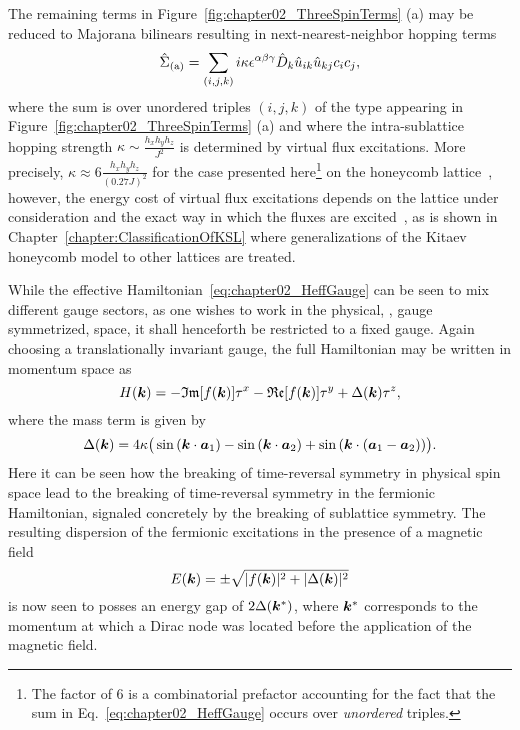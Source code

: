 The remaining terms in Figure~\ref{fig:chapter02_ThreeSpinTerms} (a) may be reduced to Majorana bilinears resulting in next-nearest-neighbor hopping terms
%
\begin{equation}
	\hat{\Sigma}_{\rm (a)} = \sum_{(i,j,k)} i \kappa \epsilon^{\alpha\beta\gamma} \hat{D}_k \hat{u}_{ik} \hat{u}_{kj} c_i c_j,
	\label{eq:chapter02_HeffGauge}
\end{equation}
%
where the sum is over unordered triples $(i,j,k)$ of the type appearing in Figure~\ref{fig:chapter02_ThreeSpinTerms} (a) and where the intra-sublattice hopping strength $\kappa \sim \frac{h_x h_y h_z}{J^2}$ is determined by virtual flux excitations.
More precisely, $\kappa \approx 6\frac{h_x h_y h_z}{(0.27 J)^2}$ for the case presented here\footnote{The factor of $6$ is a combinatorial prefactor accounting for the fact that the sum in Eq.~\eqref{eq:chapter02_HeffGauge} occurs over \textit{unordered} triples.} on the honeycomb lattice~\cite{KitaevAoP2006}, however, the energy cost of virtual flux excitations depends on the lattice under consideration and the exact way in which the fluxes are excited~\cite{OBrienPRB2016}, as is shown in Chapter~\ref{chapter:ClassificationOfKSL} where generalizations of the Kitaev honeycomb model to other lattices are treated.

While the effective Hamiltonian~\eqref{eq:chapter02_HeffGauge} can be seen to mix different gauge sectors, as one wishes to work in the physical, \ie, gauge symmetrized, space, it shall henceforth be restricted to a fixed gauge.
Again choosing a translationally invariant gauge, the full Hamiltonian may be written in momentum space as
%
\begin{equation}
	H(\bm{k}) = -\mathfrak{Im}[f(\bm{k})] \tau^x - \mathfrak{Re}[f(\bm{k})] \tau^y + \Delta(\bm{k}) \tau^z,
	\label{eq:chapter02_KitaevHamiltonianMagnetic}
\end{equation}
%
where the mass term is given by
%
\begin{equation}
	\Delta(\bm{k}) = 4\kappa \big(\sin{(\bm{k}\cdot \bm{a}_1)} - \sin{(\bm{k}\cdot \bm{a}_2)} + \sin{(\bm{k}\cdot (\bm{a}_1 - \bm{a}_2))}\big).
\end{equation}
%
Here it can be seen how the breaking of time-reversal symmetry in physical spin space lead to the breaking of time-reversal symmetry in the fermionic Hamiltonian, signaled concretely by the breaking of sublattice symmetry.
The resulting dispersion of the fermionic excitations in the presence of a magnetic field
%
\begin{equation}
	E(\bm{k}) = \pm \sqrt{|f(\bm{k})|^2 + |\Delta(\bm{k})|^2}
\end{equation}
%
is now seen to posses an energy gap of $2\Delta(\bm{k}^*)$, where $\bm{k}^*$ corresponds to the momentum at which a Dirac node was located before the application of the magnetic field.


